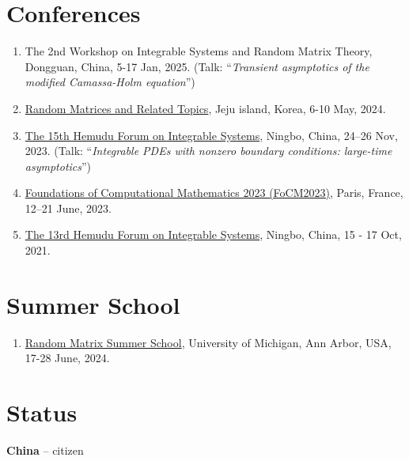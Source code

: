 \documentclass[margin]{res}
\begin{document}
\begin{resume}
\section{Conferences}
\begin{enumerate}[--]
\item The 2nd Workshop on Integrable Systems and Random Matrix Theory, Dongguan, China, 5-17 Jan, 2025. (Talk: ``{\sl Transient asymptotics of the modified Camassa-Holm equation}'')
\item \href{http://newton.kias.re.kr/~namgyu/index.html/Jeju24/}{Random Matrices and Related Topics}, Jeju island, Korea, 6-10 May, 2024.
\item \href{https://math.nbu.edu.cn/info/1084/6870.htm}{The 15th Hemudu Forum on Integrable Systems}, Ningbo, China, 24--26 Nov, 2023. (Talk: ``{\sl Integrable PDEs with nonzero boundary conditions: large-time asymptotics}'')
\item \href{https://focm2023.pages.math.cnrs.fr}{Foundations of Computational Mathematics 2023 (FoCM2023)}, Paris, France, 12--21 June, 2023.
\item \href{http://math.nbu.edu.cn/info/1084/3673.htm}{The 13rd Hemudu Forum on Integrable Systems}, Ningbo, China, 15 - 17 Oct, 2021.
\end{enumerate}


\section{Summer School}
\begin{enumerate}[--]
   \item \href{https://sites.google.com/umich.edu/rmtschool/}{Random Matrix Summer School}, University of Michigan, Ann Arbor, USA, 17-28 June, 2024.
\end{enumerate}

\section{Status}
\textbf{China} -- citizen


\end{resume}
\end{document}
